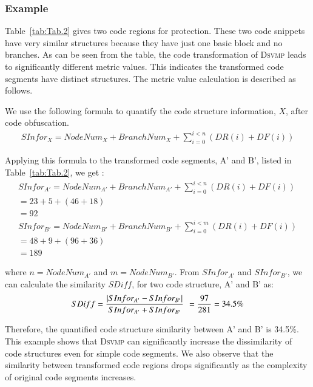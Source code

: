 \documentclass[preprint,12pt,3p]{elsarticle}
\newcommand{\DSVMP}{\textsc{Dsvmp}\xspace}
\begin{document}
\subsubsection{Example}
Table~\ref{tab:Tab.2} gives two code regions for protection. These  two code snippets have very similar structures because they have just one basic block and no branches.
As can be seen from the table, the code transformation of \DSVMP leads to significantly different metric values. This indicates the transformed code segments have distinct structures.
The metric value calculation is described as follows.

We use the following formula to quantify the code structure information, $X$, after code obfuscation.
\[\begin{array}{l}
 SInfo{r_{X}} = NodeNu{m_{X}} + BranchNu{m_{X}} + \sum\limits_{i = 0}^{i < n} {(DR(i) + DF(i))}
 \end{array}\]

Applying this formula to the transformed code segments, A' and  B', listed in Table~\ref{tab:Tab.2},  we get :
\[\begin{array}{l}
 SInfo{r_{A'}} = NodeNu{m_{A'}} + BranchNu{m_{A'}} + \sum\limits_{i = 0}^{i < n} {(DR(i) + DF(i))} \\
                                        = 23 + 5 + (46 + 18)\\
                                        = 92 \\
 SInfo{r_{B'}} = NodeNu{m_{B'}} + BranchNu{m_{B'}} + \sum\limits_{i = 0}^{i < m} {(DR(i) + DF(i))}  \\
                                        = 48 + 9 + (96 + 36)\\
                                        =  189
\end{array}\]

where $n=NodeNu{m_{A'}}$ and $m=NodeNu{m_{B'}}$.
From $SInfo{r_{A'}}$ and $SInfo{r_{B'}}$,
we can calculate the similarity $SDiff$, for two code structure, A' and B' as:
\begin{align*}
SDiff = \frac{{|SInfo{r_{A'}} - SInfo{r_{B'}}|}}{{SInfo{r_{A'}} + SInfo{r_{B'}}}}\;{\kern 1pt}  = \frac{{97}}{{281}} = 34.5\% \end{align*}

Therefore, the quantified code structure similarity between A' and B' is  34.5\%.
This example shows that \DSVMP can significantly increase the dissimilarity of code structures even for simple code segments.
We also observe that the similarity between transformed code regions drops significantly
as the complexity of original code segments increases.
\end{document}
